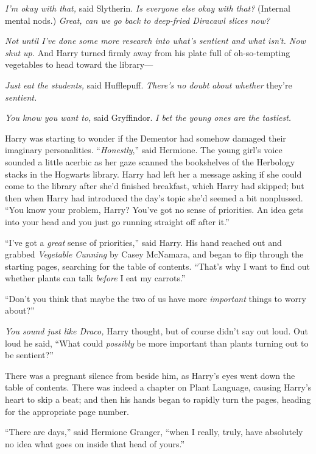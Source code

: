 \emph{I’m okay with that,} said Slytherin. \emph{Is everyone else okay with that?} (Internal mental nods.) \emph{Great, can we go back to deep-fried Diracawl slices now?}

\emph{Not until I’ve done some more research into what’s sentient and what isn’t. Now shut up.} And Harry turned firmly away from his plate full of oh-so-tempting vegetables to head toward the library—

\emph{Just eat the students,} said Hufflepuff. \emph{There’s no doubt about whether} they’re\emph{ sentient.}

\emph{You know you want to,} said Gryffindor. \emph{I bet the young ones are the tastiest.}

Harry was starting to wonder if the Dementor had somehow damaged their imaginary personalities.
\sbreak
“\emph{Honestly},” said Hermione. The young girl’s voice sounded a little acerbic as her gaze scanned the bookshelves of the Herbology stacks in the Hogwarts library. Harry had left her a message asking if she could come to the library after she’d finished breakfast, which Harry had skipped; but then when Harry had introduced the day’s topic she’d seemed a bit nonplussed. “You know your problem, Harry? You’ve got no sense of priorities. An idea gets into your head and you just go running straight off after it.”

“I’ve got a \emph{great} sense of priorities,” said Harry. His hand reached out and grabbed \emph{Vegetable Cunning} by Casey McNamara, and began to flip through the starting pages, searching for the table of contents. “That’s why I want to find out whether plants can talk \emph{before} I eat my carrots.”

“Don’t you think that maybe the two of us have more \emph{important} things to worry about?”

\emph{You sound just like Draco,} Harry thought, but of course didn’t say out loud. Out loud he said, “What could \emph{possibly} be more important than plants turning out to be sentient?”

There was a pregnant silence from beside him, as Harry’s eyes went down the table of contents. There was indeed a chapter on Plant Language, causing Harry’s heart to skip a beat; and then his hands began to rapidly turn the pages, heading for the appropriate page number.

“There are days,” said Hermione Granger, “when I really, truly, have absolutely no idea what goes on inside that head of yours.”

